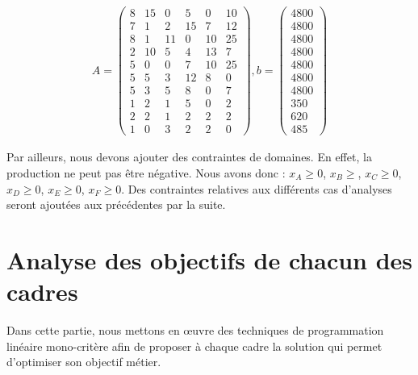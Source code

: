 \documentclass[12pt]{article}
\begin{document}
\begin{align*}
A =
 \begin{pmatrix}
  8	&15	&0 &5& 0 &10\\
7	&1	&2	&15	&7	&12\\
8	&1	&11	&0	&10	&25\\
2	&10	&5	&4	&13	&7\\
5	&0 &0 &7	&10   &25\\
5 &5 &3 &12 &8 &0\\
5 &3 &5 &8 &0 &7\\
1 &2 &1 &5 &0 &2\\
2 &2 &1 &2 &2 &2\\
1 &0 &3 &2 &2 &0
 \end{pmatrix}
  , b = 
   \left (
   \begin{aligned}
      4800 \\
      4800 \\
      4800 \\
      4800 \\
      4800 \\
      4800 \\
      4800\\
      350\\
      620\\
      485
   \end{aligned}
   \right ) 
 \end{align*}
 
Par ailleurs, nous devons ajouter des contraintes de domaines. En effet, la production ne peut pas être négative. Nous avons donc :
\(x_{A} \geq 0\), \(x_{B} \geq\), \(x_{C} \geq 0\), \(x_{D} \geq 0\), \(x_{E} \geq 0\), \(x_{F} \geq 0 \).
Des contraintes relatives aux différents cas d'analyses seront ajoutées aux précédentes par la suite.
\section{Analyse des objectifs de chacun des cadres}
Dans cette partie, nous mettons en œuvre des techniques de programmation linéaire mono-critère afin de proposer à chaque cadre la solution qui permet d'optimiser son objectif métier.
\end{document}
